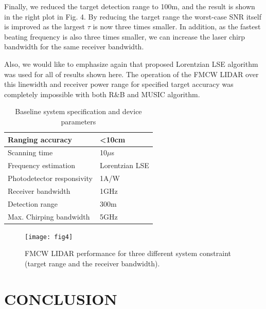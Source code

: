 \documentclass{article}
\begin{document}
Finally, we reduced the target detection range to 100m, and the result is shown in the right plot in Fig. 4. By reducing the target range the worst-case SNR itself is improved as the largest $\tau$ is now three times smaller. In addition, as the fastest beating frequency is also three times smaller, we can increase the laser chirp bandwidth for the same receiver bandwidth. 

Also, we would like to emphasize again that proposed Lorentzian LSE algorithm was used for all of results shown here. The operation of the FMCW LIDAR over this linewidth and receiver power range for specified target accuracy was completely impossible with both R\&B and MUSIC algorithm.


\begin{table}[!t]
\caption{Baseline system specification and device parameters}
\vspace{1em}
\label{tbl1}
\centering
\begin{tabu} to 0.9\linewidth { X[c] X[c] }
\hline
 Ranging accuracy & \textless 10cm \\   
 \hline
 Scanning time & 10$\mu$s \\ 
 \hline
 Frequency estimation & Lorentzian LSE \\ 
 \hline
 Photodetector responsivity & 1A/W \\   
 \hline
  Receiver bandwidth & 1GHz \\ 
 \hline
  Detection range & 300m \\   
 \hline
  Max. Chirping bandwidth & 5GHz \\  
 \hline

\end{tabu}
\end{table}

\begin{figure}[t!]
\begin{minipage}[b]{1.0\linewidth}
  \centering
  \centerline{\texttt{[image: fig4]}}
\end{minipage}
\caption{FMCW LIDAR performance for three different system constraint (target range and the receiver bandwidth).}
\label{fig:end2end}
\end{figure}


\section{CONCLUSION}
\label{sec:conclusion}
\end{document}
